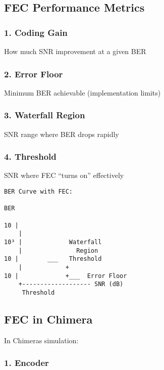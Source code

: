 \subsection{FEC Performance Metrics}\label{fec-performance-metrics}

\subsubsection{1. Coding Gain}\label{coding-gain}

How much SNR improvement at a given BER

\subsubsection{2. Error Floor}\label{error-floor}

Minimum BER achievable (implementation limits)

\subsubsection{3. Waterfall Region}\label{waterfall-region}

SNR range where BER drops rapidly

\subsubsection{4. Threshold}\label{threshold}

SNR where FEC ``turns on'' effectively

\begin{verbatim}
BER Curve with FEC:

BER
 
10 |
    |  
10³ |             Waterfall
    |               Region
10 |        ___   Threshold
    |            +
10 |             +___  Error Floor
    +------------------- SNR (dB)
     Threshold
\end{verbatim}

\subsection{FEC in Chimera}\label{fec-in-chimera}

In Chimera\textquotesingle s simulation:

\subsubsection{1. Encoder}\label{encoder}

